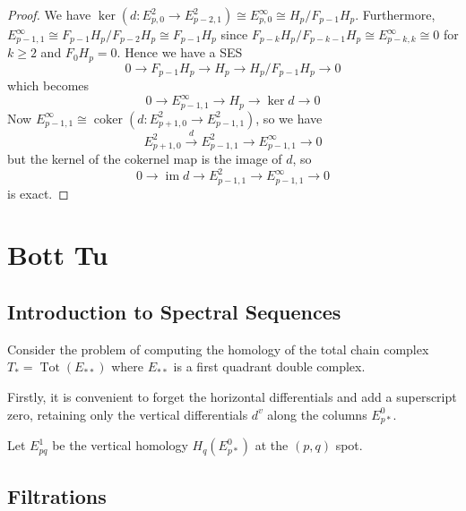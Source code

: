 \documentclass[reqno]{amsart}
\theoremstyle{definition}
\theoremstyle{remark}
\DeclareMathOperator{\im}{im}
\DeclareMathOperator{\coker}{coker}
\DeclareMathOperator{\Tot}{Tot}
\begin{document}
    \begin{proof}
        We have
        $\ker \left( d \colon
        E_{p,0}^2 \to  E_{p-2,1}^2 \right) 
        \cong E_{p,0}^{\infty}
        \cong H_{p} / F_{p-1} H_{p}$. Furthermore,
        $E_{p-1,1}^{\infty} \cong
        F_{p-1} H_{p} / F_{p-2} H_p \cong
        F_{p-1} H_p$ since
        $F_{p-k} H_p / F_{p-k-1} H_p \cong
        E_{p-k,k}^{\infty} \cong 0$ for
        $k\ge 2$ and $F_{0} H_p = 0$.
        Hence we have
        a SES 
        \[
        0 \to F_{p-1}H_p \to H_p \to H_p / F_{p-1} H_p \to 0
        \] 
        which becomes
        \[
            0 \to E_{p-1,1}^{\infty}
            \to H_p
        \to \ker d \to 0
        \] 
        Now
        $E_{p-1,1}^{\infty} \cong
        \coker \left( d \colon E_{p+1,0}^2 \to 
        E_{p-1,1}^2 \right) $, so we have
        \[
        E_{p+1,0}^2 \stackrel{d}{\to} 
        E_{p-1,1}^2 \to E_{p-1,1}^{\infty} \to 0
        \] 
        but the kernel of the cokernel map is the
        image of $d$, so
        \[
        0 \to \im d \to E_{p-1,1}^2 \to 
        E_{p-1,1}^{\infty} \to 0
        \] 
        is exact.
    \end{proof}












\newpage 
\section{Bott Tu}
\subsection{Introduction to Spectral Sequences}

Consider the problem of computing the homology
of the total chain complex
$T_* = \Tot(E_{* * })$ where
$E_{* *}$ is a first quadrant double complex.

Firstly, it is convenient to forget the horizontal differentials
and add a superscript zero, retaining only the vertical
differentials $d^{v}$ along the columns
$E_{p*}^{0}$.

Let $E_{pq}^{1}$ be the vertical homology
$H_q \left( E_{p*}^{0} \right) $ at the
$(p,q)$ spot.





\subsection{Filtrations}
\end{document}
